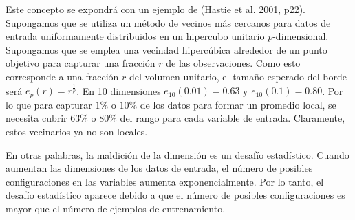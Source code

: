 Este concepto se expondrá con un ejemplo de (Hastie et al. 2001, p22). Supongamos que se utiliza un método de vecinos más cercanos para datos de entrada uniformamente distribuidos en un hipercubo unitario $p$-dimensional. Supongamos que se emplea una vecindad hipercúbica alrededor de un punto objetivo para capturar una fracción $r$ de las observaciones. Como esto corresponde a una fracción $r$ del volumen unitario, el tamaño esperado del borde será $e_p(r) = r^{\frac{1}{p}}$. En 10 dimensiones $e_10(0.01)=0.63$ y $e_10(0.1) = 0.80$. Por lo que para capturar $1\%$ o $10\%$ de los datos para formar un promedio local, se necesita cubrir $63\%$ o $80\%$ del rango para cada variable de entrada. Claramente, estos vecinarios ya no son locales. \cite{hastie01statisticallearning}

\vspace{1em}

En otras palabras, la maldición de la dimensión es un desafío estadístico. Cuando aumentan las dimensiones de los datos de entrada, el número de posibles configuraciones en las variables aumenta exponencialmente. Por lo tanto, el desafío estadístico aparece debido a que el número de posibles configuraciones es mayor que el número de ejemplos de entrenamiento.
\cite{goodfellow-et-al-2016}

